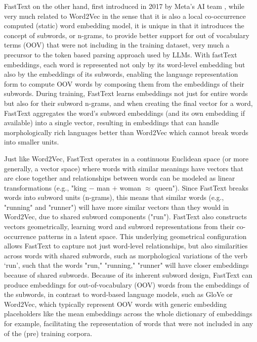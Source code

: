 \documentclass[final]{clv2025}
\begin{document}
FastText on the other hand, first introduced in 2017 by Meta’s AI team \cite{articleboja}, while very much related to Word2Vec in the sense that it is also a local co-occurrence computed (static) word embedding model, it is unique in that it introduces the concept of subwords, or n-grams, to provide better support for out of vocabulary terms (OOV) that were not including in the training dataset, very much a precursor to the token based parsing approach used by LLMs. With fastText embeddings, each word is represented not only by its word-level embedding but also by the embeddings of its subwords, enabling the language representation form to compute OOV words by composing them from the embeddings of their subwords. During training, FastText learns embeddings not just for entire words but also for their subword n-grams, and when creating the final vector for a word, FastText aggregates the word's subword embeddings (and its own embedding if available) into a single vector, resulting in embeddings that can handle morphologically rich languages better than Word2Vec which cannot break words into smaller units. 

Just like Word2Vec, FastText operates in a continuous Euclidean space (or more generally, a vector space) where words with similar meanings have vectors that are close together and relationships between words can be modeled as linear transformations (e.g., "king $-$ man $+$ woman $\approx$ queen"). Since FastText breaks words into subword units (n-grams), this means that similar words (e.g., "running" and "runner") will have more similar vectors than they would in Word2Vec, due to shared subword components ("run"). FastText also constructs vectors geometrically, learning word and subword representations from their co-occurrence patterns in a latent space. This underlying geometrical configuration allows FastText to capture not just word-level relationships, but also similarities across words with shared subwords, such as morphological variations of the verb ‘run’, such that the words "run," "running," "runner" will have closer embeddings because of shared subwords. Because of its inherent subword design, FastText can produce  embeddings for out-of-vocabulary (OOV) words from the embeddings of the subwords, in contrast to word-based language models, such as GloVe or Word2Vec, which typically represent OOV words with generic embedding placeholders like the mean embeddings across the whole dictionary of embeddings for example, facilitating the representation of words that were not included in any of the (pre) training corpora.
\end{document}
